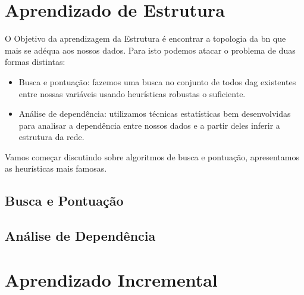 \section{Aprendizado de Estrutura}
O Objetivo da aprendizagem da Estrutura é encontrar a topologia da \gls{bn} que mais se adéqua aos nossos dados. Para isto podemos atacar o problema de duas formas distintas:
\begin{itemize}
	\item Busca e pontuação: fazemos uma busca no conjunto de todos \gls{dag} existentes entre nossas variáveis usando heurísticas robustas o suficiente.
	\item Análise de dependência: utilizamos técnicas estatísticas bem desenvolvidas para analisar a dependência entre nossos dados e a partir deles inferir a estrutura da rede.
\end{itemize}

Vamos começar discutindo sobre algoritmos de busca e pontuação, apresentamos as heurísticas mais famosas.

\subsection{Busca e Pontuação}



\subsection{Análise de Dependência}

\section{Aprendizado Incremental}